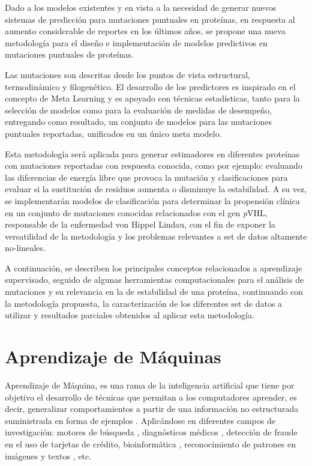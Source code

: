 Dado a los modelos existentes y en vista a la necesidad de generar nuevos sistemas de predicción para mutaciones puntuales en proteínas, en respuesta al aumento considerable de reportes en los últimos años, se propone una nueva metodología para el diseño e implementación de modelos predictivos en mutaciones puntuales de proteínas.

Las mutaciones son descritas desde los puntos de vista estructural, termodinámico y filogenético. El desarrollo de los predictores es inspirado en el concepto de Meta Learning y es apoyado con técnicas estadísticas, tanto para la selección de modelos como para la evaluación de medidas de desempeño, entregando como resultado, un conjunto de modelos para las mutaciones puntuales reportadas, unificados en un único meta modelo.

Esta metodología será aplicada para generar estimadores en diferentes proteínas con mutaciones reportadas con respuesta conocida, como por ejemplo: evaluando las diferencias de energía libre que provoca la mutación y clasificaciones para evaluar si la sustitución de residuos aumenta o disminuye la estabilidad. A su vez, se implementarán modelos de clasificación para determinar la propensión clínica en un conjunto de mutaciones conocidas relacionados con el gen \textit{p}VHL, responsable de la enfermedad von Hippel Lindau, con el fin de exponer la versatilidad de la metodología y los problemas relevantes a set de datos altamente no-lineales.

A continuación, se describen los principales conceptos relacionados a aprendizaje supervisado, seguido de algunas herramientas computacionales para el análisis de mutaciones y su relevancia en la de estabilidad de una proteína, continuando con la metodología propuesta, la caracterización de los diferentes set de datos a utilizar y resultados parciales obtenidos al aplicar esta metodología.

\section{Aprendizaje de Máquinas}

Aprendizaje de Máquina, es una rama de la inteligencia artificial que tiene por objetivo el desarrollo de técnicas que permitan a los computadores aprender, es decir, generalizar comportamientos a partir de una información no estructurada suministrada en forma de ejemplos \cite{michie1994machine}. Aplicándose en diferentes campos de investigación: motores de búsqueda \cite{cooley1997web}, diagnósticos médicos \cite{7912315,ABDELAZIZ2018117}, detección de fraude en el uso de tarjetas de crédito, bioinformática \cite{juanito}, reconocimiento de patrones en imágenes \cite{imageA} y textos \cite{netzer2011reading,alm2005emotions}, etc. 

